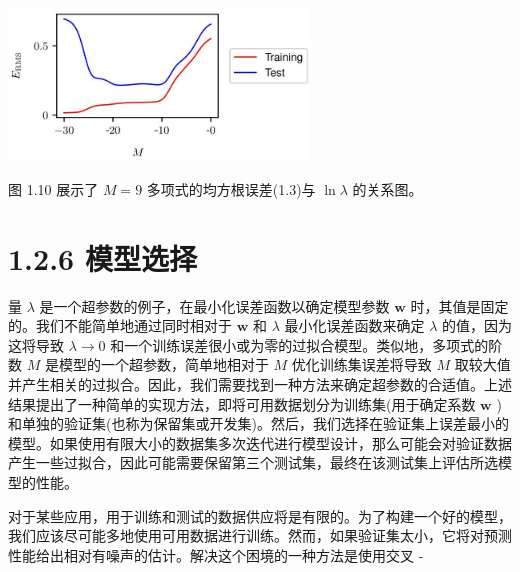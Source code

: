 \documentclass[10pt]{report}
\begin{document}
\begin{center}
\includegraphics[max width=0.6\textwidth]{images/0194e279-9b28-703a-88f4-c3ac21e2010d_33_798_344_753_382_0.jpg}
\end{center}
\hspace*{3em} 

图 1.10 展示了 \(M = 9\) 多项式的均方根误差(1.3)与 \(\ln \lambda\) 的关系图。

\section*{1.2.6 模型选择}

量 \(\lambda\) 是一个超参数的例子，在最小化误差函数以确定模型参数 \(\mathbf{w}\) 时，其值是固定的。我们不能简单地通过同时相对于 \(\mathbf{w}\) 和 \(\lambda\) 最小化误差函数来确定 \(\lambda\) 的值，因为这将导致 \(\lambda  \rightarrow  0\) 和一个训练误差很小或为零的过拟合模型。类似地，多项式的阶数 \(M\) 是模型的一个超参数，简单地相对于 \(M\) 优化训练集误差将导致 \(M\) 取较大值并产生相关的过拟合。因此，我们需要找到一种方法来确定超参数的合适值。上述结果提出了一种简单的实现方法，即将可用数据划分为训练集(用于确定系数 \(\mathbf{w}\) )和单独的验证集(也称为保留集或开发集)。然后，我们选择在验证集上误差最小的模型。如果使用有限大小的数据集多次迭代进行模型设计，那么可能会对验证数据产生一些过拟合，因此可能需要保留第三个测试集，最终在该测试集上评估所选模型的性能。

对于某些应用，用于训练和测试的数据供应将是有限的。为了构建一个好的模型，我们应该尽可能多地使用可用数据进行训练。然而，如果验证集太小，它将对预测性能给出相对有噪声的估计。解决这个困境的一种方法是使用交叉 -
\end{document}
